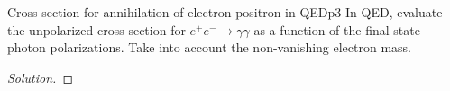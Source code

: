 \begin{problem}{Cross section for annihilation of electron-positron in QED}{p3}
    In QED, evaluate the unpolarized cross section for \(e^+ e^- \to \gamma \gamma\) as a function of the final state photon polarizations. Take into account the non-vanishing electron mass.
\end{problem}
\begin{proof}[Solution]
    
\end{proof}
